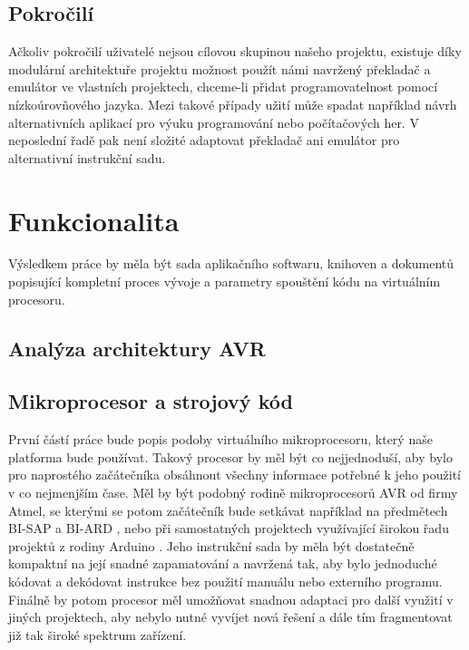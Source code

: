 \subsection{Pokročilí}

Ačkoliv pokročilí uživatelé nejsou cílovou skupinou našeho projektu, existuje díky modulární architektuře projektu možnost použít námi navržený překladač a emulátor ve vlastních projektech, chceme-li přidat programovatelnost pomocí nízkoúrovňového jazyka. Mezi takové případy užití může spadat například návrh alternativních aplikací pro výuku programování nebo počítačových her. V neposlední řadě pak není složité adaptovat překladač ani emulátor pro alternativní instrukční sadu.

\section{Funkcionalita}

Výsledkem práce by měla být sada aplikačního softwaru, knihoven a dokumentů popisující kompletní proces vývoje a parametry spouštění kódu na virtuálním procesoru.

\subsection{Analýza architektury AVR}


\subsection{Mikroprocesor a strojový kód}

První částí práce bude popis podoby virtuálního mikroprocesoru, který naše platforma bude používat. Takový procesor by měl být co nejjednoduší, aby bylo pro naprostého začátečníka obsáhnout všechny informace potřebné k jeho použití v co nejmenjším čase. Měl by být podobný rodině mikroprocesorů AVR od firmy Atmel, se kterými se potom začátečník bude setkávat například na předmětech BI-SAP a BI-ARD , nebo při samostatných projektech využívající širokou řadu projektů z rodiny Arduino . Jeho instrukční sada by měla být dostatečně kompaktní na její snadné zapamatování a navržená tak, aby bylo jednoduché kódovat a dekódovat instrukce bez použití manuálu nebo externího programu. Finálně by potom procesor měl umožňovat snadnou adaptaci pro další využití v jiných projektech, aby nebylo nutné vyvíjet nová řešení a dále tím fragmentovat již tak široké spektrum zařízení.

